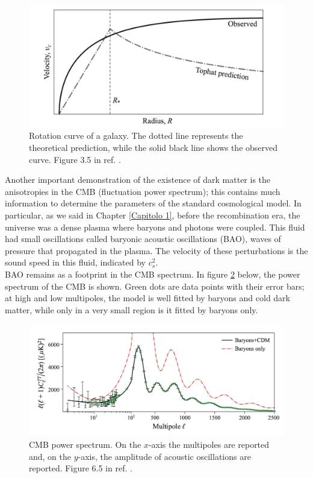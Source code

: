 \begin{figure}[h!]
\centering
    \includegraphics[width=0.65\linewidth]{Images/Chapter2/Rotation curve.png}
    \caption[Rotation curve of a galaxy]{Rotation curve of a galaxy. The dotted line represents the theoretical prediction, while the solid black line shows the observed curve. Figure 3.5 in ref. \cite{2024darkmatter}.}
\label{rotation speed of galaxy}
\end{figure}

Another important demonstration of the existence of dark matter is the anisotropies in the CMB (fluctuation power spectrum); this contains much information to determine the parameters of the standard cosmological model. In particular, as we said in Chapter \ref{Capitolo 1}, before the recombination era, the universe was a dense plasma where baryons and photons were coupled. This fluid had small oscillations called baryonic acoustic oscillations (BAO), waves of pressure that propagated in the plasma. The velocity of these perturbations is the sound speed in this fluid, indicated by $c_s^2$.\\ BAO remains as a footprint in the CMB spectrum. In figure \ref{CMB power spectrum} below, the power spectrum of the CMB is shown. Green dots are data points with their error bars; at high and low multipoles, the model is well fitted by baryons and cold dark matter, while only in a very small region is it fitted by baryons only.

\begin{figure}[h!]
\centering
    \includegraphics[width=0.7\linewidth]{Images/Chapter2/Screen dark matter libro.png}
    \caption[CMB power spectrum]{CMB power spectrum. On the $x$-axis the multipoles are reported and, on the $y$-axis, the amplitude of acoustic oscillations are reported. Figure 6.5 in ref. \cite{2024darkmatter}.}
\label{CMB power spectrum}
\end{figure}

